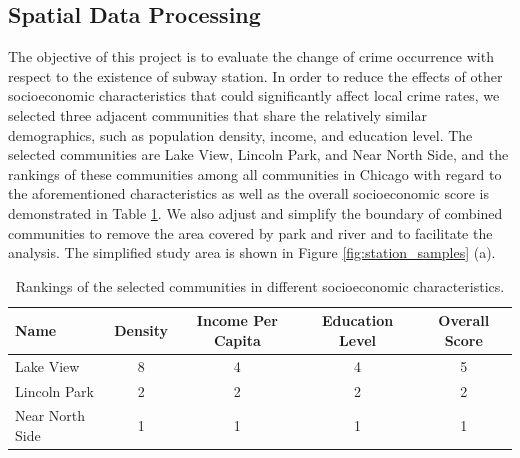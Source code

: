 \documentclass[a4paper, 11pt]{article}
\begin{document}
\subsection{Spatial Data Processing}

The objective of this project is to evaluate the change of crime occurrence with respect to the existence of subway station. In order to reduce the effects of other socioeconomic characteristics that could significantly affect local crime rates, we selected three adjacent communities that share the relatively similar demographics, such as population density, income, and education level. The selected communities are Lake View, Lincoln Park, and Near North Side, and the rankings of these communities among all communities in Chicago with regard to the aforementioned characteristics as well as the overall socioeconomic score is demonstrated in Table \ref{tab:community_index}. We also adjust and simplify the boundary of combined communities to remove the area covered by park and river and to facilitate the analysis. The simplified study area is shown in Figure \ref{fig:station_samples} (a). 

\vspace{0.5cm}
\begin{table}[!h] \centering
\caption{Rankings of the selected communities in different socioeconomic characteristics.}
\label{tab:community_index}
\begin{tabular}{ l c c c c}
 \hline\hline
 Name & Density & Income Per Capita & Education Level & Overall Score \\ 
 \hline
 Lake View & 8 & 4 & 4 & 5\\  
 Lincoln Park & 2 & 2 & 2 & 2\\
 Near North Side & 1 & 1 & 1 & 1 \\
 \hline\hline
\end{tabular}
\end{table}
\end{document}
